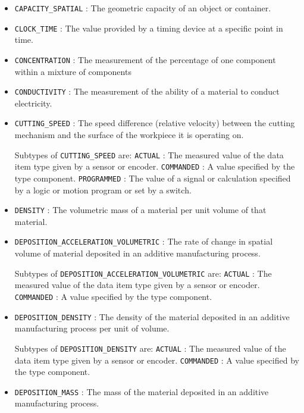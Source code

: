 \begin{itemize}
\item \texttt{CAPACITY_SPATIAL} : The geometric capacity of an object or container. 

\item \texttt{CLOCK_TIME} : The value provided by a timing device at a specific point in time. 

\item \texttt{CONCENTRATION} : The measurement of the percentage of one component within a mixture of components 

\item \texttt{CONDUCTIVITY} : The measurement of the ability of a material to conduct electricity. 

\item \texttt{CUTTING_SPEED} : The speed difference (relative velocity) between the cutting mechanism and the surface of the workpiece it is operating on. 

Subtypes of \texttt{CUTTING_SPEED} are: 
\newline\tab \texttt{ACTUAL} : The measured value of the data item type given by a sensor or encoder. 
\newline\tab \texttt{COMMANDED} : A value specified by the  type component. 
\newline\tab \texttt{PROGRAMMED} : The value of a signal or calculation specified by a logic or motion program or set by a switch. 
\item \texttt{DENSITY} : The volumetric mass of a material per unit volume of that material. 

\item \texttt{DEPOSITION_ACCELERATION_VOLUMETRIC} : The rate of change in spatial volume of material deposited in an additive manufacturing process. 

Subtypes of \texttt{DEPOSITION_ACCELERATION_VOLUMETRIC} are: 
\newline\tab \texttt{ACTUAL} : The measured value of the data item type given by a sensor or encoder. 
\newline\tab \texttt{COMMANDED} : A value specified by the  type component. 
\item \texttt{DEPOSITION_DENSITY} : The density of the material deposited in an additive manufacturing process per unit of volume. 

Subtypes of \texttt{DEPOSITION_DENSITY} are: 
\newline\tab \texttt{ACTUAL} : The measured value of the data item type given by a sensor or encoder. 
\newline\tab \texttt{COMMANDED} : A value specified by the  type component. 
\item \texttt{DEPOSITION_MASS} : The mass of the material deposited in an additive manufacturing process. 


\end{itemize}
